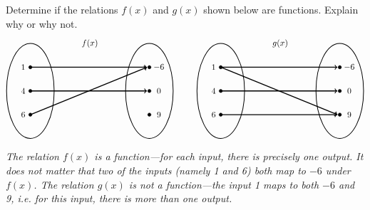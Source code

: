 \documentclass[11pt,letterpaper]{article}
\begin{document}


 Determine if the relations $f(x)$ and $g(x)$ shown below are functions. Explain why or why not. 
	\[
	\begin{tikzpicture}
	\node at (2.5,2) {$f(x)$};
	\draw[line width=0.03cm] (0,0) circle (1 and 2);
	\draw[line width=0.03cm] (5,0) circle (1 and 2);
	
	\draw[fill=black] (0,1) circle (0.07);
	\draw[fill=black] (0,0) circle (0.07);
	\draw[fill=black] (0,-1) circle (0.07);
	
	\draw[fill=black] (5,1) circle (0.07);
	\draw[fill=black] (5,0) circle (0.07);
	\draw[fill=black] (5,-1) circle (0.07);
	
	\draw[line width=0.04cm,->] (0,1) -- (4.9,1);
	\draw[line width=0.04cm,->] (0,0) -- (4.9,0);
	\draw[line width=0.04cm,->] (0,-1) -- (4.9,1);
	
	\node at (-0.3,1) {$1$};
	\node at (-0.3,0) {$4$};
	\node at (-0.3,-1) {$6$};
	
	\node at (5.4,1) {$-6$};
	\node at (5.4,0) {$0$};
	\node at (5.4,-1) {$9$};
	
	\tikzset{shift={(8,0)}}
	\node at (2.5,2) {$g(x)$};
	\draw[line width=0.03cm] (0,0) circle (1 and 2);
	\draw[line width=0.03cm] (5,0) circle (1 and 2);
	
	\draw[fill=black] (0,1) circle (0.07);
	\draw[fill=black] (0,0) circle (0.07);
	\draw[fill=black] (0,-1) circle (0.07);
	
	\draw[fill=black] (5,1) circle (0.07);
	\draw[fill=black] (5,0) circle (0.07);
	\draw[fill=black] (5,-1) circle (0.07);
	
	\draw[line width=0.04cm,->] (0,1) -- (4.9,1);
	\draw[line width=0.04cm,->] (0,1) -- (4.9,-1);
	\draw[line width=0.04cm,->] (0,0) -- (4.9,0);
	\draw[line width=0.04cm,->] (0,-1) -- (4.9,-1);
	
	\node at (-0.3,1) {$1$};
	\node at (-0.3,0) {$4$};
	\node at (-0.3,-1) {$6$};
	
	\node at (5.4,1) {$-6$};
	\node at (5.4,0) {$0$};
	\node at (5.4,-1) {$9$};
	\end{tikzpicture}
	\] \pspace

{\itshape The relation $f(x)$ is a function---for each input, there is precisely one output. It does not matter that two of the inputs (namely 1 and 6) both map to $-6$ under $f(x)$. The relation $g(x)$ is not a function---the input 1 maps to both $-6$ and 9, i.e. for this input, there is more than one output.}
\end{document}
